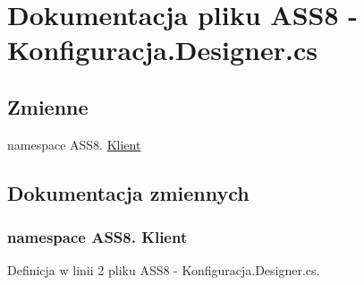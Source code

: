 \hypertarget{a00039}{
\section{Dokumentacja pliku ASS8 - Konfiguracja.Designer.cs}
\label{d3/de7/a00039}
}
\subsection*{Zmienne}
\begin{CompactItemize}
\item 
﻿namespace ASS8. \hyperlink{a00039_50d8d80fabd02a9a24fb725624e1ad24}{Klient}
\end{CompactItemize}


\subsection{Dokumentacja zmiennych}
\hypertarget{a00039_50d8d80fabd02a9a24fb725624e1ad24}{
\subsubsection[{Klient}]{\setlength{\rightskip}{0pt plus 5cm}﻿namespace ASS8. Klient}}
\label{d3/de7/a00039_50d8d80fabd02a9a24fb725624e1ad24}




Definicja w linii 2 pliku ASS8 - Konfiguracja.Designer.cs.